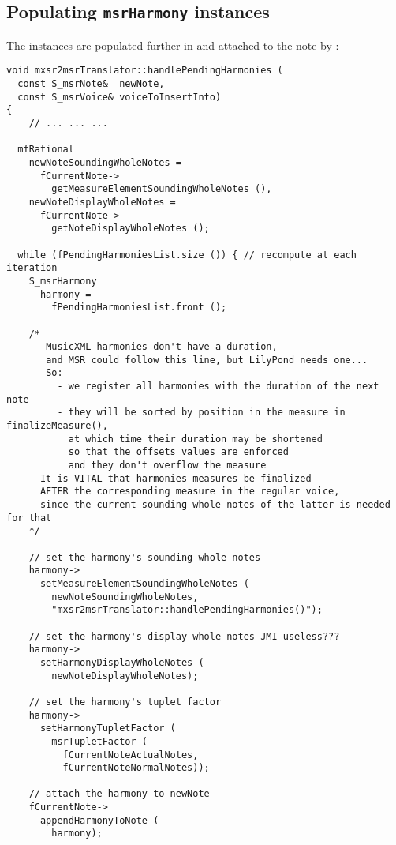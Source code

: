 \subsection{Populating {\tt msrHarmony} instances}

The  instances are populated further in  and attached to the note by : %
\begin{lstlisting}[language=CPlusPlus]
void mxsr2msrTranslator::handlePendingHarmonies (
  const S_msrNote&  newNote,
  const S_msrVoice& voiceToInsertInto)
{
	// ... ... ...

  mfRational
    newNoteSoundingWholeNotes =
      fCurrentNote->
        getMeasureElementSoundingWholeNotes (),
    newNoteDisplayWholeNotes =
      fCurrentNote->
        getNoteDisplayWholeNotes ();

  while (fPendingHarmoniesList.size ()) { // recompute at each iteration
    S_msrHarmony
      harmony =
        fPendingHarmoniesList.front ();

    /*
       MusicXML harmonies don't have a duration,
       and MSR could follow this line, but LilyPond needs one...
       So:
         - we register all harmonies with the duration of the next note
         - they will be sorted by position in the measure in finalizeMeasure(),
           at which time their duration may be shortened
           so that the offsets values are enforced
           and they don't overflow the measure
      It is VITAL that harmonies measures be finalized
      AFTER the corresponding measure in the regular voice,
      since the current sounding whole notes of the latter is needed for that
    */

    // set the harmony's sounding whole notes
    harmony->
      setMeasureElementSoundingWholeNotes (
        newNoteSoundingWholeNotes,
        "mxsr2msrTranslator::handlePendingHarmonies()");

    // set the harmony's display whole notes JMI useless???
    harmony->
      setHarmonyDisplayWholeNotes (
        newNoteDisplayWholeNotes);

    // set the harmony's tuplet factor
    harmony->
      setHarmonyTupletFactor (
        msrTupletFactor (
          fCurrentNoteActualNotes,
          fCurrentNoteNormalNotes));

    // attach the harmony to newNote
    fCurrentNote->
      appendHarmonyToNote (
        harmony);


\end{lstlisting}
